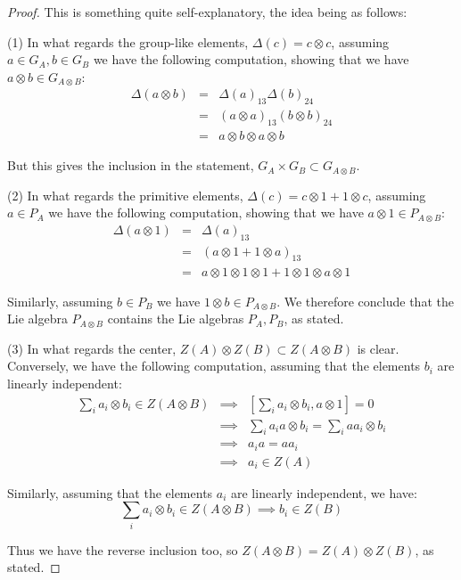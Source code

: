\documentclass[12pt]{amsbook}
\begin{document}
\begin{proof}
This is something quite self-explanatory, the idea being as follows:

\medskip

(1) In what regards the group-like elements, $\Delta(c)=c\otimes c$, assuming $a\in G_A,b\in G_B$ we have the following computation, showing that we have $a\otimes b\in G_{A\otimes B}$:
\begin{eqnarray*}
\Delta(a\otimes b)
&=&\Delta(a)_{13}\Delta(b)_{24}\\
&=&(a\otimes a)_{13}(b\otimes b)_{24}\\
&=&a\otimes b\otimes a\otimes b
\end{eqnarray*}

But this gives the inclusion in the statement, $G_A\times G_B\subset G_{A\otimes B}$.

\medskip

(2) In what regards the primitive elements, $\Delta(c)=c\otimes 1+1\otimes c$, assuming $a\in P_A$ we have the following computation, showing that we have $a\otimes 1\in P_{A\otimes B}$:
\begin{eqnarray*}
\Delta(a\otimes 1)
&=&\Delta(a)_{13}\\
&=&(a\otimes 1+1\otimes a)_{13}\\
&=&a\otimes 1\otimes 1\otimes 1+1\otimes 1\otimes a\otimes 1
\end{eqnarray*}

Similarly, assuming $b\in P_B$ we have $1\otimes b\in P_{A\otimes B}$. We therefore conclude that the Lie algebra $P_{A\otimes B}$ contains the Lie algebras $P_A,P_B$, as stated.

\medskip

(3) In what regards the center, $Z(A)\otimes Z(B)\subset Z(A\otimes B)$ is clear. Conversely, we have the following computation, assuming that the elements $b_i$ are linearly independent:
\begin{eqnarray*}
\sum_ia_i\otimes b_i\in Z(A\otimes B)
&\implies&\left[\sum_ia_i\otimes b_i,a\otimes 1\right]=0\\
&\implies&\sum_ia_ia\otimes b_i=\sum_iaa_i\otimes b_i\\
&\implies&a_ia=aa_i\\
&\implies&a_i\in Z(A)
\end{eqnarray*}

Similarly, assuming that the elements $a_i$ are linearly independent, we have:
$$\sum_ia_i\otimes b_i\in Z(A\otimes B)\implies b_i\in Z(B)$$

Thus we have the reverse inclusion too, so $Z(A\otimes B)=Z(A)\otimes Z(B)$, as stated.
\end{proof}
\end{document}
